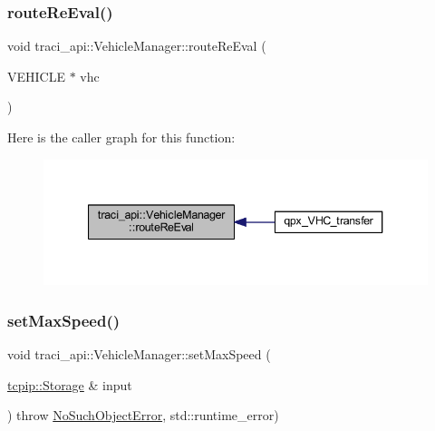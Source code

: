 \subsubsection{\texorpdfstring{route\+Re\+Eval()}{routeReEval()}}
{\footnotesize\ttfamily void traci\+\_\+api\+::\+Vehicle\+Manager\+::route\+Re\+Eval (\begin{DoxyParamCaption}\item[{V\+E\+H\+I\+C\+LE $\ast$}]{vhc }\end{DoxyParamCaption})}

Here is the caller graph for this function\+:\nopagebreak
\begin{figure}[H]
\begin{center}
\leavevmode
\includegraphics[width=340pt]{classtraci__api_1_1_vehicle_manager_a02bcdc3429c0b027345148d9f5824554_icgraph}
\end{center}
\end{figure}
\mbox{\label{classtraci__api_1_1_vehicle_manager_a5bd46032db2b057eb7e5a5c61d043827}} 
\subsubsection{\texorpdfstring{set\+Max\+Speed()}{setMaxSpeed()}}
{\footnotesize\ttfamily void traci\+\_\+api\+::\+Vehicle\+Manager\+::set\+Max\+Speed (\begin{DoxyParamCaption}\item[{\hyperlink{classtcpip_1_1_storage}{tcpip\+::\+Storage} \&}]{input }\end{DoxyParamCaption}) throw  \hyperlink{classtraci__api_1_1_no_such_object_error}{No\+Such\+Object\+Error}, std\+::runtime\+\_\+error) }

